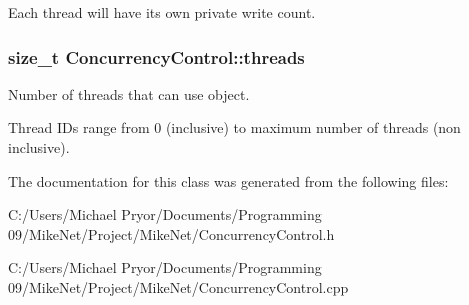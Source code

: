 Each thread will have its own private write count. \hypertarget{class_concurrency_control_a0a94abcc70c42d61b057bddeb32a6e52}{
\subsubsection[{threads}]{\setlength{\rightskip}{0pt plus 5cm}size\_\-t {\bf ConcurrencyControl::threads}}}
\label{class_concurrency_control_a0a94abcc70c42d61b057bddeb32a6e52}


Number of threads that can use object. 

Thread IDs range from 0 (inclusive) to maximum number of threads (non inclusive). 

The documentation for this class was generated from the following files:\begin{DoxyCompactItemize}
\item 
C:/Users/Michael Pryor/Documents/Programming 09/MikeNet/Project/MikeNet/ConcurrencyControl.h\item 
C:/Users/Michael Pryor/Documents/Programming 09/MikeNet/Project/MikeNet/ConcurrencyControl.cpp\end{DoxyCompactItemize}
